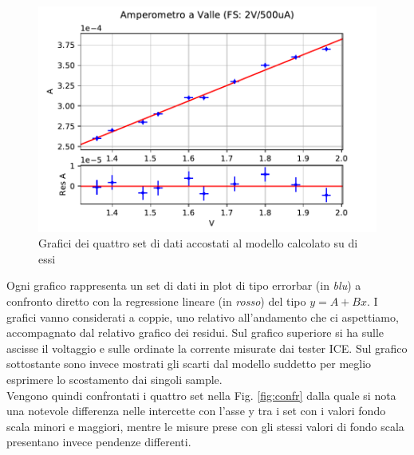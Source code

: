 \documentclass{article}
\begin{document}
\begin{figure}[t]
\begin{minipage}{0.5\textwidth}
    \end{minipage}\hfill
    \begin{minipage}{0.5\textwidth}
        \centering
        \includegraphics[width=\textwidth]{data/AmpVal2V500uA.pdf} 
    \end{minipage}
    \caption{Grafici dei quattro set di dati accostati al modello calcolato su di essi}
    \label{fig:quattro}
\end{figure}

Ogni grafico rappresenta un set di dati in plot di tipo errorbar (in \textit{blu}) a confronto diretto con la regressione lineare (in \textit{rosso}) del tipo $y=A+Bx$. I grafici vanno considerati a coppie, uno relativo all'andamento che ci aspettiamo, accompagnato dal relativo grafico dei residui. Sul grafico superiore si ha sulle ascisse il voltaggio e sulle ordinate la corrente misurate dai tester ICE. Sul grafico sottostante sono invece mostrati gli scarti dal modello suddetto per meglio esprimere lo scostamento dai singoli sample.\\
Vengono quindi confrontati i quattro set nella Fig. \ref{fig:confr} dalla quale si nota una notevole differenza nelle intercette con l'asse y tra i set con i valori fondo scala minori e maggiori, mentre le misure prese con gli stessi valori di fondo scala presentano invece pendenze differenti.
\end{document}
